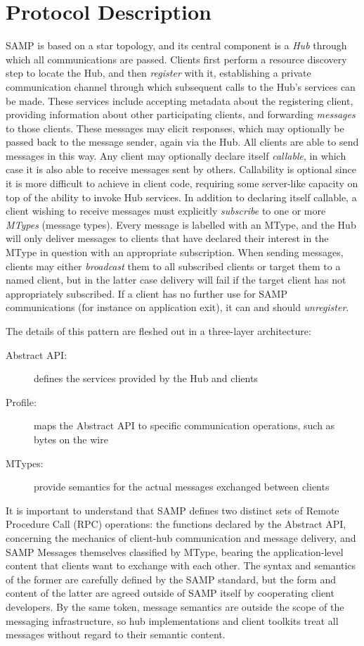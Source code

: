 \documentclass[5p]{elsarticle}
\begin{document}
\section{Protocol Description} \label{sec:protocol}

SAMP is based on a star topology, and its central component is a
{\em Hub\/} through which all communications are passed.
Clients first perform a resource discovery step to locate the Hub,
and then {\em register\/} with it, establishing a private communication
channel through which subsequent calls to the Hub's services can be made.
These services include accepting metadata about the registering client,
providing information about other participating clients,
and forwarding {\em messages\/} to those clients.
These messages may elicit responses, which may optionally be passed
back to the message sender, again via the Hub.
All clients are able to send messages in this way.
Any client may optionally declare itself {\em callable\/},
in which case it is also able to receive messages sent by others.
Callability is optional since it is more difficult to
achieve in client code, requiring some server-like capacity
on top of the ability to invoke Hub services.
In addition to declaring itself callable, a client wishing to
receive messages must explicitly {\em subscribe\/} to one or
more {\em MTypes} (message types).  Every message is labelled
with an MType, and the Hub will only deliver messages to clients
that have declared their interest in the MType in question with
an appropriate subscription.  When sending messages, clients may
either {\em broadcast\/} them to all subscribed clients or
target them to a named client, but in the latter case delivery
will fail if the target client has not appropriately subscribed.
If a client has no further use for SAMP communications
(for instance on application exit), it can and should {\em unregister\/}.

The details of this pattern are fleshed out in a three-layer architecture:
\begin{description}
\item[Abstract API:] defines the services provided by the Hub and clients
\item[Profile:] maps the Abstract API to specific communication operations,
  such as bytes on the wire
\item[MTypes:] provide semantics for the actual messages exchanged between
  clients
\end{description}

It is important to understand that SAMP defines two distinct sets of
Remote Procedure Call (RPC) operations:
the functions declared by the Abstract API,
concerning the mechanics of client-hub communication and message delivery,
and SAMP Messages themselves classified by MType,
bearing the application-level content that clients want
to exchange with each other.
The syntax and semantics of the former are carefully defined by the
SAMP standard, but the form and content of the latter are
agreed outside of SAMP itself by cooperating client developers.
By the same token, message semantics are outside the scope of the
messaging infrastructure, so hub implementations and client toolkits
treat all messages without regard to their semantic content.
\end{document}
